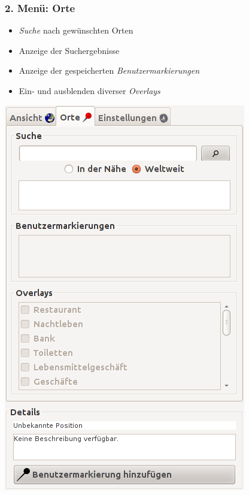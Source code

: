\documentclass[10pt]{scrreprt}
\newcommand{\textref}[1]{\mbox{\raisebox{0.1ex}{\small$\rightarrow$ }\textit{#1}}}
\begin{document}
\vspace{10mm}
\begin{minipage}[t]{9cm}
\vspace{-40mm}
\subsubsection{2. Menü: Orte} 
	\begin{itemize}
	\item \textref{Suche} nach gewünschten Orten 
	\item Anzeige der Suchergebnisse
	\item Anzeige der gespeicherten \textref{Benutzermarkierungen} 
	\item Ein- und ausblenden diverser \textref{Overlays} 
	\end{itemize}
\end{minipage}
\begin{minipage}{7cm}
\centering
\includegraphics[scale=0.35]{images/orte_tab.png}
\end{minipage}
\end{document}
